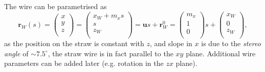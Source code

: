 \documentclass[a4paper,11pt]{article}
\begin{document}
The wire can be parametrised as 
\begin{equation}
\textbf{r}_W(s) = \begin{pmatrix}x\\y\\z\\\end{pmatrix} = \begin{pmatrix}x_W + m_x s\\ s\\  z_W\\\end{pmatrix} = \textbf{u}s+\textbf{r}_W^0=\begin{pmatrix} m_x \\ 1\\  0\\\end{pmatrix}s + \begin{pmatrix}x_W  \\0 \\  z_W\\\end{pmatrix},
\label{eq:wire}
\end{equation}
as the position on the straw is constant with $z$, and slope in $x$ is due to the \textit{stereo angle} of $\sim 7.5^{\circ}$, the straw wire is in fact parallel to the $xy$ plane. Additional wire parameters can be added later (e.g. rotation in the $zx$ plane).
\end{document}
